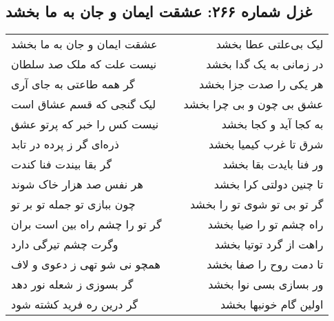 \begin{center}
\section*{غزل شماره ۲۶۶: عشقت ایمان و جان به ما بخشد}
\label{sec:266}
\begin{longtable}{l p{0.5cm} r}
عشقت ایمان و جان به ما بخشد
&&
لیک بی‌علتی عطا بخشد
\\
نیست علت که ملک صد سلطان
&&
در زمانی به یک گدا بخشد
\\
گر همه طاعتی به جای آری
&&
هر یکی را صدت جزا بخشد
\\
لیک گنجی که قسم عشاق است
&&
عشق بی چون و بی چرا بخشد
\\
نیست کس را خبر که پرتو عشق
&&
به کجا آید و کجا بخشد
\\
ذره‌ای گر ز پرده در تابد
&&
شرق تا غرب کیمیا بخشد
\\
گر بقا بیندت فنا کندت
&&
ور فنا بایدت بقا بخشد
\\
هر نفس صد هزار خاک شوند
&&
تا چنین دولتی کرا بخشد
\\
چون ببازی تو جمله تو بر تو
&&
گر تو بی تو شوی تو را بخشد
\\
گر تو را چشم راه بین است بران
&&
راه چشم تو را ضیا بخشد
\\
وگرت چشم تیرگی دارد
&&
راهت از گرد توتیا بخشد
\\
همچو نی شو تهی ز دعوی و لاف
&&
تا دمت روح را صفا بخشد
\\
گر بسوزی ز شعله نور دهد
&&
ور بسازی بسی نوا بخشد
\\
گر درین ره فرید کشته شود
&&
اولین گام خونبها بخشد
\\
\end{longtable}
\end{center}
